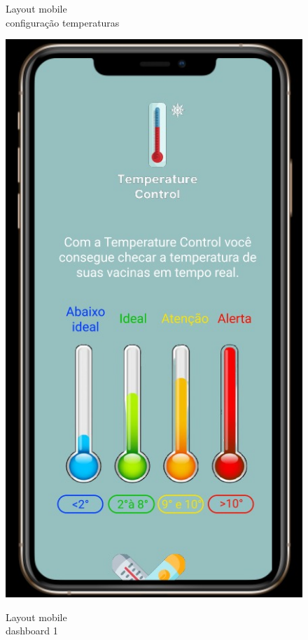     \begin{figure}
        \centering
        \begin{minipage}{0.5\textwidth}
            \caption{Layout mobile \\ configuração temperaturas}
            \centering
            \includegraphics[height=0.4\textheight]{img/mobile/config_temp.jpeg}
            \label{fig:mobileConfig}
        \end{minipage}%
        \begin{minipage}{0.5\textwidth}
            \caption{Layout mobile \\ dashboard 1}

\end{minipage}
\end{figure}
